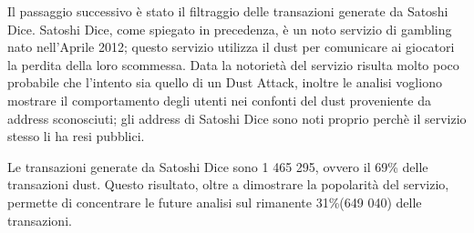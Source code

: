 Il passaggio successivo è stato il filtraggio delle transazioni generate da Satoshi Dice. Satoshi Dice, come spiegato in precedenza, è un noto servizio di gambling nato nell'Aprile 2012; questo servizio utilizza il dust per comunicare ai giocatori la perdita della loro scommessa. Data la notorietà del servizio risulta molto poco probabile che l'intento sia quello di un Dust Attack, inoltre le analisi vogliono mostrare il comportamento degli utenti nei confonti del dust proveniente da address sconosciuti; gli address di Satoshi Dice sono noti proprio perchè il servizio stesso li ha resi pubblici.

Le transazioni generate da Satoshi Dice sono 1 465 295, ovvero il 69\% delle transazioni dust. Questo risultato, oltre a dimostrare la popolarità del servizio, permette di concentrare le future analisi sul rimanente 31\%(649 040) delle transazioni.
